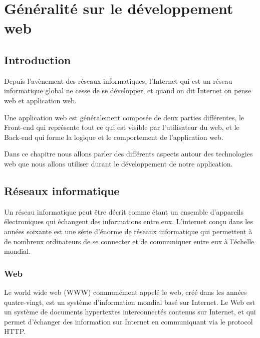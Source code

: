 \chapter{Généralité sur le développement web }
\section{Introduction }
\par Depuis l'avènement des réseaux informatiques, l’Internet qui est un réseau
informatique global ne cesse de se développer, et quand on dit Internet on
pense web et application web.
\par Une application web est généralement composée de deux parties différentes,
le Front-end qui représente tout ce qui est visible par l’utilisateur du web,
et le Back-end qui forme la logique et le comportement de l’application web.
\par Dans ce chapitre nous allons parler des différents aspects autour des
technologies web que nous allons utiliser durant le développement de notre
application.

\section{Réseaux informatique}
\par Un réseau informatique peut être décrit comme étant un ensemble
d'appareils électroniques qui échangent des informations entre eux. L’internet
conçu dans les années soixante est une série d'énorme de réseaux informatique
qui permettent à de nombreux ordinateurs de se connecter et de communiquer
entre eux à l'échelle mondial.\cite{ref6}
\subsection{Web }
\par Le world wide web (WWW) communément appelé le web, créé dans les années
quatre-vingt, est un système d'information mondial basé sur Internet. Le Web
est un système de documents hypertextes interconnectés contenus sur Internet,
et qui permet d’échanger des information sur Internet en communiquant via le
protocol HTTP.\cite{ref6}
